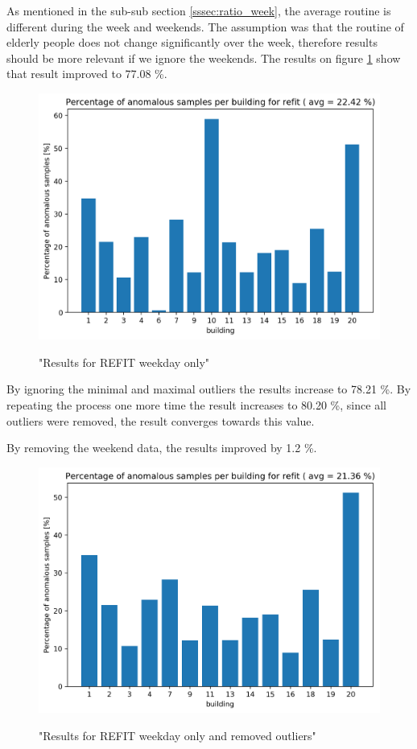 As mentioned in the sub-sub section \ref{sssec:ratio_week}, the average routine is different during the week and weekends.
The assumption was that the routine of elderly people does not change significantly over the week, therefore results should be more relevant if we ignore the weekends.
The results on figure \ref{fig:refit_res_nw_1"} show that result improved to 77.08 \%.

\begin{figure}[H]
	\centering
	\caption{"Results for REFIT weekday only"}
	\includegraphics[width=.8\textwidth]{Figures/EC/refit_res_nw_1.png}
	\label{fig:refit_res_nw_1"}
\end{figure}

By ignoring the minimal and maximal outliers the results increase to 78.21 \%.
By repeating the process one more time the result increases to 80.20 \%, since all outliers were removed, the result converges towards this value. 

By removing the weekend data, the results improved by 1.2 \%. 

\begin{figure}[H]
	\centering
	\caption{"Results for REFIT weekday only and removed outliers"}
	\includegraphics[width=.8\textwidth]{Figures/EC/refit_res_nw_2.png}
	\label{fig:refit_res_nw_2"}
\end{figure}

